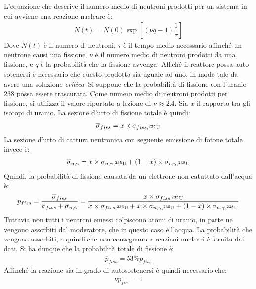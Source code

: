 \documentclass[../main.tex]{subfile}
\begin{document}
	\begin{svol}
		L'equazione che descrive il numero medio di neutroni prodotti per un sistema in cui avviene una reazione nucleare è:
		\begin{gather}
			N(t)=N(0)\exp\left[(\nu q-1)\dfrac{1}{\tau}\right]
		\end{gather}
		Dove $ N(t) $ è il numero di neutroni, $ \tau $ è il tempo medio necessario affinché un neutrone causi una fissione, $ \nu $ è il numero medio di neutroni prodotti da una fissione, e $ q $ è la probabilità che la fissione avvenga. Affiché il reattore possa auto sotenersi è necessario che questo prodotto sia uguale ad uno, in modo tale da avere una soluzione \emph{critica}. Si suppone che la probabilità di fissione con l'uranio 238 possa essere trascurata. Come numero medio di neutroni prodotti per fissione, si utilizza il valore riportato a lezione di $ \nu\approx2.4 $. Sia $ x $ il rapporto tra gli isotopi di uranio. La sezione d'urto di fissione totale è quindi:
		\begin{gather}
			\overline{\sigma}_{fiss}=x\times\sigma_{fiss,^{235}\mathrm{U}}
		\end{gather}
		La sezione d'urto di cattura neutronica con seguente emissione di fotone totale invece è:
		\begin{gather}
			\label{eqn:sigmafiss}
			\overline{\sigma}_{n,\gamma}=x\times\sigma_{n,\gamma,^{235}\mathrm{U}}+(1-x)\times\sigma_{n,\gamma,^{238}\mathrm{U}}
		\end{gather}
		Quindi, la probabilità di fissione causata da un elettrone non catuttato dall'acqua è:
		\begin{gather}
			p_{fiss}=\dfrac{\overline{\sigma}_{fiss}}{\overline{\sigma}_{fiss}+\overline{\sigma}_{n,\gamma}}=\dfrac{x\times\sigma_{fiss,^{235}\mathrm{U}}}{x\times\sigma_{fiss,^{235}\mathrm{U}}+x\times\sigma_{n,\gamma,^{235}\mathrm{U}}+(1-x)\times\sigma_{n,\gamma,^{238}\mathrm{U}}}
		\end{gather}
		Tuttavia non tutti i neutroni emessi colpiscono atomi di uranio, in parte ne vengono assorbiti dal moderatore, che in questo caso è l'acqua. La probabilità che vengano assorbiti, e quindi che non conseguano a reazioni nucleari è fornita dai dati. Si ha dunque che la probabilità totale di fissione è:
		\begin{gather}
			\overline{p}_{fiss}=53\%p_{fiss}
		\end{gather}
		Affinché la reazione sia in grado di autosostenersi è quindi necessario che:
		\begin{gather}
			\nu\overline{p}_{fiss}=1

\end{gather}
\end{svol}
\end{document}
